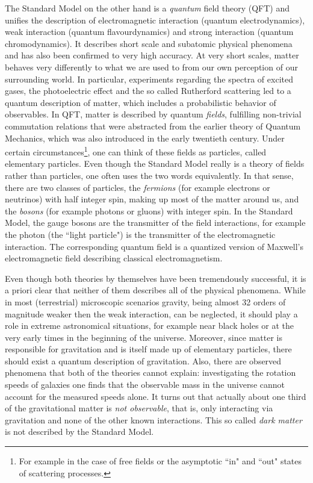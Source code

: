 The Standard Model on the other hand is a \emph{quantum} field theory (QFT) and unifies the description of electromagnetic interaction (quantum electrodynamics), weak interaction (quantum flavourdynamics) and strong interaction (quantum chromodynamics). It describes short scale and subatomic physical phenomena and has also been confirmed to very high accuracy. At very short scales, matter behaves very differently to what we are used to from our own perception of our surrounding world. In particular, experiments regarding the spectra of excited gases, the photoelectric effect and the so called Rutherford scattering led to a quantum description of matter, which includes a probabilistic behavior of observables.  In QFT, matter is described by quantum \emph{fields}, fulfilling non-trivial commutation relations that were abstracted from the earlier theory of Quantum Mechanics, which was also introduced in the early twentieth century. Under certain circumstances\footnote{For example in the case of free fields or the asymptotic ``in" and ``out" states of scattering processes.}, one can think of these fields as particles, called elementary particles. Even though the Standard Model really is a theory of fields rather than particles, one often uses the two words equivalently. In that sense, there are two classes of particles, the \emph{fermions} (for example electrons or neutrinos) with half integer spin, making up most of the matter around us, and the \emph{bosons} (for example photons or gluons) with integer spin. In the Standard Model, the gauge bosons are the transmitter of the field interactions, for example the photon (the ``light particle") is the transmitter of the electromagnetic interaction. The corresponding quantum field is a quantized version of Maxwell's electromagnetic field describing classical electromagnetism.\par
%
%
Even though both theories by themselves have been tremendously successful, it is a priori clear that neither of them describes all of the physical phenomena. While in most (terrestrial) microscopic scenarios gravity, being almost {32} orders of magnitude weaker then the weak interaction, can be neglected, it should play a role in extreme astronomical situations, for example near black holes or at the very early times in the beginning of the universe. Moreover, since matter is responsible for gravitation and is itself made up of elementary particles, there should exist a quantum description of gravitation. Also, there are observed phenomena that both of the theories cannot explain: investigating the rotation speeds of galaxies one finds that the observable mass in the universe cannot account for the measured speeds alone. It turns out that actually about one third of the gravitational matter is \emph{not observable}, that is, only interacting via gravitation and none of the other known interactions. This so called \emph{dark matter} is not described by the Standard Model.
